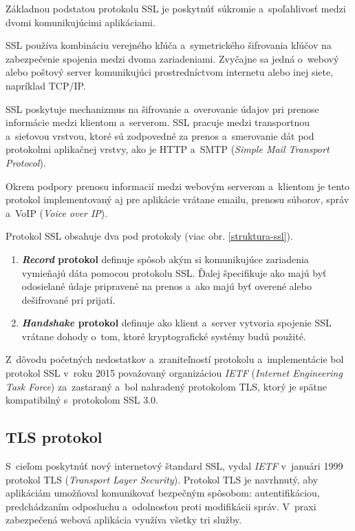 Základnou podstatou protokolu SSL je poskytnúť súkromie a~spoľahlivosť medzi dvomi komunikujúcimi aplikáciami.

SSL používa kombináciu verejného kľúča a~symetrického šifrovania kľúčov na zabezpečenie spojenia medzi dvoma zariadeniami. Zvyčajne sa jedná o~webový alebo poštový server komunikujúci prostredníctvom internetu alebo inej siete, napríklad TCP/IP.

SSL poskytuje mechanizmus na šifrovanie a~overovanie údajov pri prenose informácie medzi klientom a~serverom. SSL pracuje medzi transportnou a~sieťovou vrstvou, ktoré sú zodpovedné za prenos a~smerovanie dát pod protokolmi aplikačnej vrstvy, ako je HTTP a~SMTP (\emph{Simple Mail Transport Protocol}).

Okrem podpory prenosu informacií medzi webovým serverom a~klientom je tento protokol implementovaný aj pre aplikácie vrátane emailu, prenosu súborov, správ a~VoIP (\emph{Voice over IP}).

Protokol SSL obsahuje dva pod protokoly (viac obr. \ref{struktura-ssl}).
\begin{enumerate}

\item \textbf{\emph{Record} protokol} definuje spôsob akým si komunikujúce zariadenia vymieňajú dáta pomocou protokolu SSL. Ďalej špecifikuje ako majú byť odosielané údaje pripravené na prenos a~ako majú byť overené alebo dešifrované pri prijatí.

\item \textbf{\emph{Handshake} protokol} definuje ako klient a~server vytvoria spojenie SSL vrátane dohody o~tom, ktoré kryptografické systémy budú použité.

\end{enumerate}

Z~dôvodu početných nedostatkov a~zraniteľností protokolu a~implementácie bol protokol SSL v~roku 2015 považovaný organizáciou \emph{IETF} (\emph{Internet Engineering Task Force}) za~zastaraný a~bol nahradený protokolom TLS, ktorý je spätne kompatibilný s~protokolom SSL 3.0.

\subsection{TLS protokol}
S~cieľom poskytnúť nový internetový štandard SSL, vydal \emph{IETF} v~januári 1999 protokol TLS (\emph{Transport Layer Security}). Protokol TLS je navrhnutý, aby aplikáciám umožňoval komunikovať bezpečným spôsobom: autentifikáciou, predchádzaním odposluchu a~odolnosťou proti modifikácii správ. V~praxi zabezpečená webová aplikácia využíva všetky tri služby.

